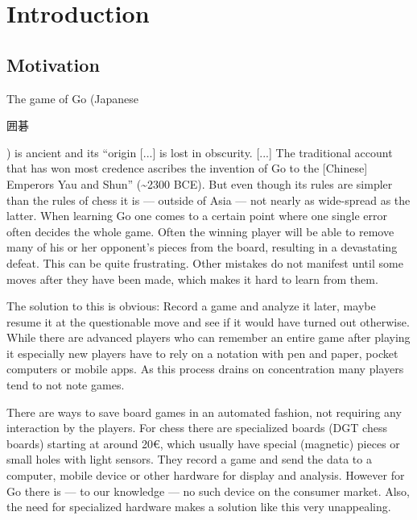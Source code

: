 
\chapter{Introduction}
	\section{Motivation}
	\label{introduction-motivation}
	The game of Go (Japanese \begingroup\setmainfont{Droid Sans Japanese}\small\begin{CJK}{UTF8}{min}囲碁\end{CJK}\endgroup ) is ancient and its ``origin [...] is lost in obscurity. [...] The traditional account that has won most credence ascribes the invention of Go to the [Chinese] Emperors Yau and Shun'' \cite{mihori1939japanese} (\textasciitilde 2300 BCE). But even though its rules are simpler than the rules of chess it is --- outside of Asia --- not nearly as wide-spread as the latter. When learning Go one comes to a certain point where one single error often decides the whole game. Often the winning player will be able to remove many of his or her opponent's pieces from the board, resulting in a devastating defeat. This can be quite frustrating. Other mistakes do not manifest until some moves after they have been made, which makes it hard to learn from them.

	The solution to this is obvious: Record a game and analyze it later, maybe resume it at the questionable move and see if it would have turned out otherwise. While there are advanced players who can remember an entire game after playing it especially new players have to rely on a notation with pen and paper, pocket computers or mobile apps. As this process drains on concentration many players tend to not note games.

	There are ways to save board games in an automated fashion, not requiring any interaction by the players. For chess there are specialized boards (DGT chess boards) starting at around 20€, which usually have special (magnetic) pieces \cite{bulsink2001device} or small holes with light sensors. They record a game and send the data to a computer, mobile device or other hardware for display and analysis. However for Go there is --- to our knowledge --- no such device on the consumer market. Also, the need for specialized hardware makes a solution like this very unappealing.

